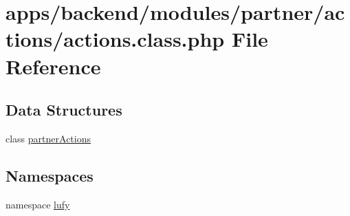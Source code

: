 \hypertarget{backend_2modules_2partner_2actions_2actions_8class_8php}{\section{apps/backend/modules/partner/actions/actions.class.\-php File Reference}
\label{backend_2modules_2partner_2actions_2actions_8class_8php}
}
\subsection*{Data Structures}
\begin{DoxyCompactItemize}
\item 
class \hyperlink{classpartner_actions}{partner\-Actions}
\end{DoxyCompactItemize}
\subsection*{Namespaces}
\begin{DoxyCompactItemize}
\item 
namespace \hyperlink{namespacelufy}{lufy}
\end{DoxyCompactItemize}
